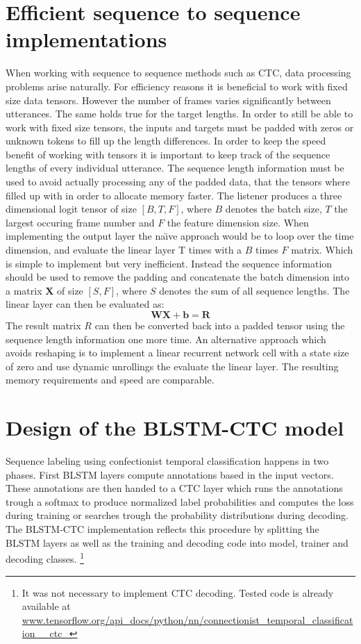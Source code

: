 \section{Efficient sequence to sequence implementations}
When working with sequence to sequence methods such as CTC, data processing problems arise naturally. For efficiency reasons it is beneficial to work with
fixed size data tensors. However the number of frames varies significantly between utterances. The same holds true for the target lengths. In order to still be able to work with fixed size tensors, the inputs and targets must be padded with zeros or unknown tokens to fill up the length differences.
In order to keep the speed benefit of working with tensors it is important to
keep track of the sequence lengths of every individual utterance.
The sequence length information must be used to avoid actually processing any of the padded data, that the tensors where filled up with in order to allocate memory faster.
The listener produces a three dimensional logit tensor of size $[B, T, F]$, where $B$ denotes the batch size, $T$ the largest occuring frame number and $F$ the feature dimension size. When implementing the output layer the na\"{\i}ve approach would be to loop over the time dimension, and evaluate the linear layer T times with a $B$ times $F$ matrix. Which is simple to implement but very inefficient. Instead the sequence information should be used to remove the padding and concatenate the batch dimension into a matrix $\mathbf{X}$ of size $[S, F]$, where $S$ denotes the sum of all sequence lengths. The linear layer can then be evaluated as:
\begin{equation}
\mathbf{W}\mathbf{X} + \mathbf{b} = \mathbf{R}
\end{equation}
The result matrix $R$ can then be converted back into a padded tensor using the sequence length information one more time.
An alternative approach which avoids reshaping is to implement a linear recurrent network cell with a state size of zero and use dynamic unrollings the evaluate the linear layer. The resulting memory requirements and speed are comparable.

\section{Design of the BLSTM-CTC model}
Sequence labeling using confectionist temporal classification happens in two phases. First BLSTM layers compute annotations based in the input vectors. These annotations are then handed to a CTC layer which runs the annotations trough a softmax to produce normalized label probabilities and computes the loss during training or searches trough the probability distributions during decoding. 
The BLSTM-CTC implementation reflects this procedure by splitting the BLSTM layers as well as the training and decoding code into model, trainer and decoding classes. \footnote{It was not necessary to implement CTC decoding. Tested code is already available at \url{www.tensorflow.org/api_docs/python/nn/connectionist\_temporal\_classification\_\_ctc\_}} 



